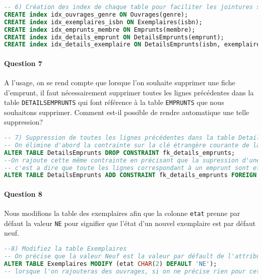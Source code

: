 \documentclass[10pt, oneside]{article}
\begin{document}
\begin{lstlisting}[language=sql, title=Question 6, label=QI6]
-- 6) Création des index de chaque table pour faciliter les jointures sur les clés étrangères
CREATE index idx_ouvrages_genre ON Ouvrages(genre);
CREATE index idx_exemplaires_isbn ON Exemplaires(isbn);
CREATE index idx_emprunts_membre ON Emprunts(membre);
CREATE index idx_details_emprunt ON DetailsEmprunts(emprunt);
CREATE index idx_details_exemplaire ON DetailsEmprunts(isbn, exemplaire);
\end{lstlisting}


\paragraph{Question 7} A l'usage, on se rend compte que lorsque l'on souhaite supprimer une fiche d'emprunt, il faut nécessairement supprimer toutes les lignes précédentes dans la table \texttt{DETAILSEMPRUNTS} qui font référence à la table \texttt{EMPRUNTS} que nous souhaitons supprimer. Comment est-il possible de rendre automatique une telle suppression?

\begin{lstlisting}[language=sql, title=Question 7, label=QI7]
-- 7) Suppression de toutes les lignes précédentes dans la table DetailsEmprunts qui font référence à la table Emprunts
-- On élimine d'abord la contrainte sur la clé étrangère courante de la table DetailsEmprunts
ALTER TABLE DetailsEmprunts DROP CONSTRAINT fk_details_emprunts;
--On rajoute cette même contrainte en précisant que la supression d'une ligne se fait en cascade,
-- c'est a dire que toute les lignes correspondant à un emprunt sont effacées
ALTER TABLE DetailsEmprunts ADD CONSTRAINT fk_details_emprunts FOREIGN KEY (emprunt) REFERENCES Emprunts(numero) ON DELETE CASCADE;
\end{lstlisting}


\paragraph{Question 8} Nous modifions la table des exemplaires afin que la colonne \texttt{etat} prenne par défaut la valeur \texttt{NE} pour signifier que l'état d'un nouvel exemplaire est par défaut neuf.
\begin{lstlisting}[language=sql, title=Question 8, label=QI8]
--8) Modifiez la table Exemplaires 
-- On précise que la valeur Neuf est la valeur par défault de l'attribut etat dans la table Exemplaires 
ALTER TABLE Exemplaires MODIFY (etat CHAR(2) DEFAULT 'NE');
-- lorsque l'on rajouteras des ouvrages, si on ne précise rien pour cet attribut, il seront automatiquement mis à neuf
\end{lstlisting}
\end{document}
